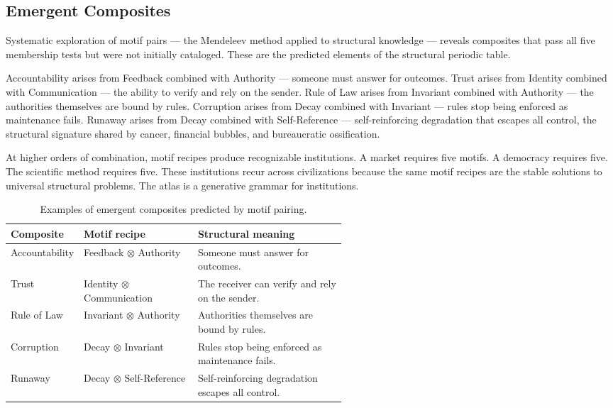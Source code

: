 \documentclass[11pt,a4paper]{article}
\newcommand{\comp}{\mathbin{\otimes}}
\begin{document}
\subsection{Emergent Composites}

Systematic exploration of motif pairs --- the Mendeleev method applied to structural knowledge --- reveals composites that pass all five membership tests but were not initially cataloged. These are the predicted elements of the structural periodic table.

Accountability arises from Feedback combined with Authority --- someone must answer for outcomes. Trust arises from Identity combined with Communication --- the ability to verify and rely on the sender. Rule of Law arises from Invariant combined with Authority --- the authorities themselves are bound by rules. Corruption arises from Decay combined with Invariant --- rules stop being enforced as maintenance fails. Runaway arises from Decay combined with Self-Reference --- self-reinforcing degradation that escapes all control, the structural signature shared by cancer, financial bubbles, and bureaucratic ossification.

At higher orders of combination, motif recipes produce recognizable institutions. A market requires five motifs. A democracy requires five. The scientific method requires five. These institutions recur across civilizations because the same motif recipes are the stable solutions to universal structural problems. The atlas is a generative grammar for institutions.

\begin{table}[ht]
\centering
\caption{Examples of emergent composites predicted by motif pairing.}
\begin{tabularx}{\linewidth}{@{}L{0.21\linewidth}L{0.34\linewidth}Y@{}}
\toprule
\textbf{Composite} & \textbf{Motif recipe} & \textbf{Structural meaning} \\
\midrule
Accountability & Feedback $\comp$ Authority & Someone must answer for outcomes. \\
Trust & Identity $\comp$ Communication & The receiver can verify and rely on the sender. \\
Rule of Law & Invariant $\comp$ Authority & Authorities themselves are bound by rules. \\
Corruption & Decay $\comp$ Invariant & Rules stop being enforced as maintenance fails. \\
Runaway & Decay $\comp$ Self-Reference & Self-reinforcing degradation escapes all control. \\
\bottomrule
\end{tabularx}
\end{table}
\end{document}
